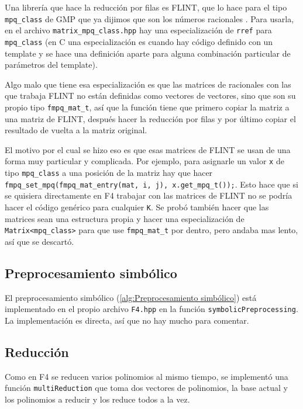 \documentclass[12pt]{report}
\theoremstyle{customstyle}
\theoremstyle{factstyle}
\newcommand\cpp{C\nolinebreak[4]\hspace{-.05em}\raisebox{.4ex}{\relsize{-3}{\textbf{++}}}\xspace}
\begin{document}
Una librería que hace la reducción por filas es FLINT, que lo hace para el tipo \texttt{mpq\_class} de GMP que ya dijimos que son los números racionales \cite{lib:flint, lib:gmp}. Para usarla, en el archivo \texttt{matrix\_mpq\_class.hpp} hay una especialización de \texttt{rref} para \texttt{mpq\_class} (en \cpp una especialización es cuando hay código definido con un template y se hace una definición aparte para alguna combinación particular de parámetros del template).

Algo malo que tiene esa especialización es que las matrices de racionales con las que trabaja FLINT no están definidas como vectores de vectores, sino que son su propio tipo \texttt{fmpq\_mat\_t}, así que la función tiene que primero copiar la matriz a una matriz de FLINT, después hacer la reducción por filas y por último copiar el resultado de vuelta a la matriz original.

El motivo por el cual se hizo eso es que esas matrices de FLINT se usan de una forma muy particular y complicada. Por ejemplo, para asignarle un valor \texttt{x} de tipo \texttt{mpq\_class} a una posición de la matriz hay que hacer \texttt{fmpq\_set\_mpq(fmpq\_mat\_entry(mat, i, j), x.get\_mpq\_t());}. Esto hace que si se quisiera directamente en F4 trabajar con las matrices de FLINT no se podría hacer el código genérico para cualquier \texttt{K}. Se probó también hacer que las matrices sean una estructura propia y hacer una especialización de \texttt{Matrix<mpq\_class>} para que use \texttt{fmpq\_mat\_t} por dentro, pero andaba mas lento, así que se descartó.

\subsection{Preprocesamiento simbólico}

El preprocesamiento simbólico (\cref{alg:Preprocesamiento simbólico}) está implementado en el propio archivo \texttt{F4.hpp} en la función \texttt{symbolicPreprocessing}. La implementación es directa, así que no hay mucho para comentar.

\subsection{Reducción}

Como en F4 se reducen varios polinomios al mismo tiempo, se implementó una función \texttt{multiReduction} que toma dos vectores de polinomios, la base actual y los polinomios a reducir y los reduce todos a la vez.
\end{document}
